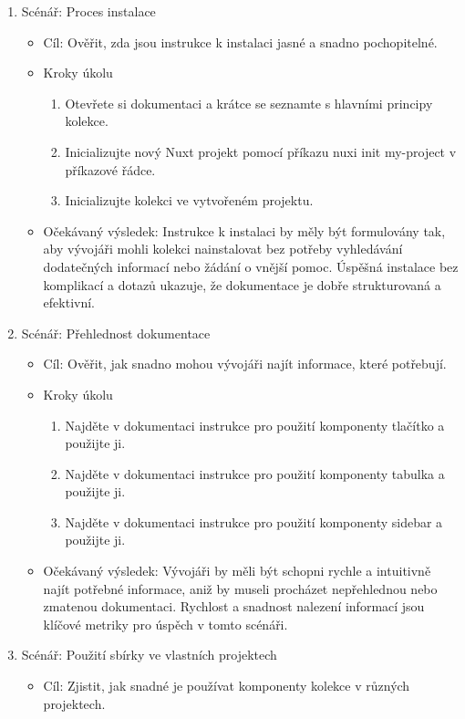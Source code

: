 \begin{enumerate}
  \item Scénář: Proces instalace
  \begin{itemize}
    \item Cíl: Ověřit, zda jsou instrukce k instalaci jasné a snadno pochopitelné.
    \item Kroky úkolu
    \begin{enumerate}
      \item Otevřete si dokumentaci a krátce se seznamte s hlavními principy kolekce.
      \item Inicializujte nový Nuxt projekt pomocí příkazu nuxi init my-project v příkazové řádce.
      \item Inicializujte kolekci ve vytvořeném projektu.
    \end{enumerate}
    \item Očekávaný výsledek: Instrukce k instalaci by měly být formulovány tak, aby vývojáři mohli kolekci nainstalovat bez potřeby vyhledávání dodatečných informací nebo žádání o vnější pomoc. Úspěšná instalace bez komplikací a dotazů ukazuje, že dokumentace je dobře strukturovaná a efektivní.
  \end{itemize}
  \item Scénář: Přehlednost dokumentace
  \begin{itemize}
    \item Cíl: Ověřit, jak snadno mohou vývojáři najít informace, které potřebují.
    \item Kroky úkolu
    \begin{enumerate}
      \item Najděte v dokumentaci instrukce pro použití komponenty tlačítko a použijte ji.
      \item Najděte v dokumentaci instrukce pro použití komponenty tabulka a použijte ji.
      \item Najděte v dokumentaci instrukce pro použití komponenty sidebar a použijte ji.
    \end{enumerate}
    \item Očekávaný výsledek: Vývojáři by měli být schopni rychle a intuitivně najít potřebné informace, aniž by museli procházet nepřehlednou nebo zmatenou dokumentaci. Rychlost a snadnost nalezení informací jsou klíčové metriky pro úspěch v tomto scénáři.
  \end{itemize}
  \item Scénář: Použití sbírky ve vlastních projektech
  \begin{itemize}
    \item Cíl: Zjistit, jak snadné je používat komponenty kolekce v různých projektech.

\end{itemize}
\end{enumerate}
